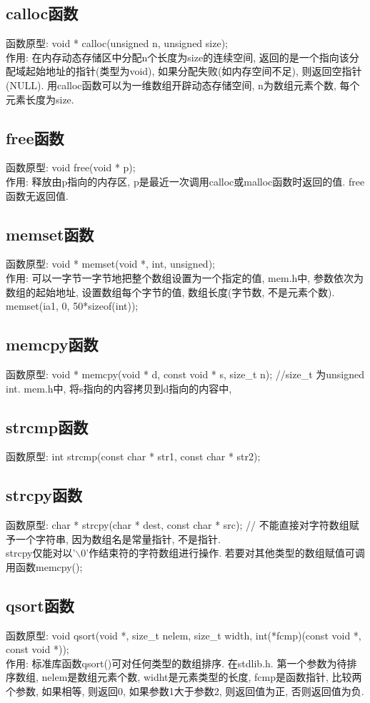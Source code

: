 \documentclass[a4paper,10pt,english]{article}
\begin{document}
\subsection{calloc函数}
函数原型: void * calloc(unsigned n, unsigned size); \\
作用: 在内存动态存储区中分配n个长度为size的连续空间, 返回的是一个指向该分配域起始地址的指针(类型为void), 如果分配失败(如内存空间不足), 则返回空指针(NULL). 用calloc函数可以为一维数组开辟动态存储空间, n为数组元素个数, 每个元素长度为size.

\subsection{free函数}
函数原型: void free(void * p); \\
作用: 释放由p指向的内存区, p是最近一次调用calloc或malloc函数时返回的值. free函数无返回值.

\subsection{memset函数}
函数原型: void * memset(void *, int, unsigned); \\
作用: 可以一字节一字节地把整个数组设置为一个指定的值, mem.h中, 参数依次为数组的起始地址, 设置数组每个字节的值, 数组长度(字节数, 不是元素个数). memset(ia1, 0, 50*sizeof(int));

\subsection{memcpy函数}
函数原型: void * memcpy(void * d, const void * s, size\_t n); //size\_t 为unsigned int. mem.h中, 将s指向的内容拷贝到d指向的内容中,

\subsection{strcmp函数}
函数原型: int strcmp(const char * str1, const char * str2); 

\subsection{strcpy函数}
函数原型: char * strcpy(char * dest, const char * src); // 不能直接对字符数组赋予一个字符串, 因为数组名是常量指针, 不是指针.\\
strcpy仅能对以'$\backslash 0$'作结束符的字符数组进行操作. 若要对其他类型的数组赋值可调用函数memcpy();

\subsection{qsort函数}
函数原型: void qsort(void *, size\_t nelem, size\_t width, int(*fcmp)(const void *, const void *)); \\
作用: 标准库函数qsort()可对任何类型的数组排序. 在stdlib.h. 第一个参数为待排序数组, nelem是数组元素个数, widht是元素类型的长度, fcmp是函数指针, 比较两个参数, 如果相等, 则返回0, 如果参数1大于参数2, 则返回值为正, 否则返回值为负.
\end{document}
